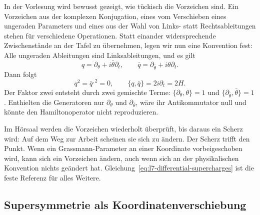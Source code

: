 In der Vorlesung wird bewusst gezeigt, wie tückisch die Vorzeichen sind. Ein Vorzeichen aus der komplexen Konjugation, eines vom Verschieben eines ungeraden Parameters und eines aus der Wahl von Links- statt Rechtsableitungen stehen für verschiedene Operationen. Statt einander widersprechende Zwischenstände an der Tafel zu übernehmen, legen wir nun eine Konvention fest: Alle ungeraden Ableitungen sind Linksableitungen, und es gilt
\begin{equation}
q=\partial_\theta+i\bar\theta\partial_t,
\qquad
\bar q=\partial_{\bar\theta}+i\theta\partial_t.
\label{eq:l7-differential-supercharges}
\end{equation}
Dann folgt
\begin{equation}
q^2=\bar q^{,2}=0,
\qquad
\{q,\bar q\}=2i\partial_t=2H.
\label{eq:l7-differential-algebra}
\end{equation}
Der Faktor zwei entsteht durch zwei gemischte Terme: \(\{\partial_\theta,\theta\}=1\) und \(\{\partial_{\bar\theta},\bar\theta\}=1\). Enthielten die Generatoren nur \(\partial_\theta\) und \(\partial_{\bar\theta}\), wäre ihr Antikommutator null und könnte den Hamiltonoperator nicht reproduzieren.

\begin{classroomqa}
\end{classroomqa}

Im Hörsaal werden die Vorzeichen wiederholt überprüft, bis daraus ein Scherz wird: Auf dem Weg zur Arbeit scheinen sie sich zu ändern. Der Scherz trifft den Punkt. Wenn ein Grassmann-Parameter an einer Koordinate vorbeigeschoben wird, kann sich ein Vorzeichen ändern, auch wenn sich an der physikalischen Konvention nichts geändert hat. Gleichung~\eqref{eq:l7-differential-supercharges} ist die feste Referenz für alles Weitere.

\subsection{Supersymmetrie als Koordinatenverschiebung}

